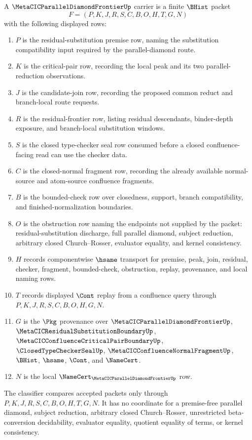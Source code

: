 \begin{definition}
\label{def:metacic-parallel-diamond-frontier-carrier}
A $\MetaCICParallelDiamondFrontierUp$ carrier is a finite $\BHist$ packet
$$
F=(P,K,J,R,S,C,B,O,H,T,G,N)
$$
with the following displayed rows:
\begin{enumerate}
\item $P$ is the residual-substitution premise row, naming the substitution compatibility input required by the parallel-diamond route.
\item $K$ is the critical-pair row, recording the local peak and its two parallel-reduction observations.
\item $J$ is the candidate-join row, recording the proposed common reduct and branch-local route requests.
\item $R$ is the residual-frontier row, listing residual descendants, binder-depth exposure, and branch-local substitution windows.
\item $S$ is the closed type-checker seal row consumed before a closed confluence-facing read can use the checker data.
\item $C$ is the closed-normal fragment row, recording the already available normal-source and atom-source confluence fragments.
\item $B$ is the bounded-check row over closedness, support, branch compatibility, and finished-normalization boundaries.
\item $O$ is the obstruction row naming the endpoints not supplied by the packet: residual-substitution discharge, full parallel diamond, subject reduction, arbitrary closed Church--Rosser, evaluator equality, and kernel consistency.
\item $H$ records componentwise $\hsame$ transport for premise, peak, join, residual, checker, fragment, bounded-check, obstruction, replay, provenance, and local naming rows.
\item $T$ records displayed $\Cont$ replay from a confluence query through $P,K,J,R,S,C,B,O,H,G,N$.
\item $G$ is the $\Pkg$ provenance over $\MetaCICParallelDiamondFrontierUp$, $\MetaCICResidualSubstitutionBoundaryUp$, $\MetaCICConfluenceCriticalPairBoundaryUp$, $\ClosedTypeCheckerSealUp$, $\MetaCICConfluenceNormalFragmentUp$, $\BHist$, $\hsame$, $\Cont$, and $\NameCert$.
\item $N$ is the local $\NameCert_{\MetaCICParallelDiamondFrontierUp}$ row.
\end{enumerate}
The classifier compares accepted packets only through $P,K,J,R,S,C,B,O,H,T,G,N$. It has no coordinate for a premise-free parallel diamond, subject reduction, arbitrary closed Church--Rosser, unrestricted beta-conversion decidability, evaluator equality, quotient equality of terms, or kernel consistency.
\end{definition}

